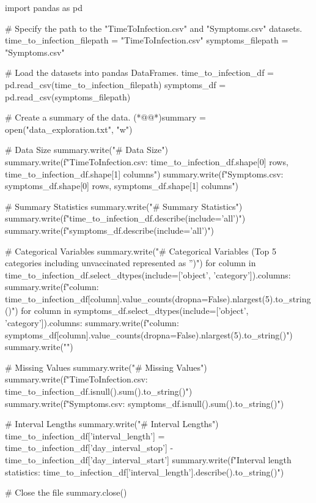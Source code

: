\documentclass[11pt]{article}
\begin{document}
\begin{python}

import pandas as pd

# Specify the path to the "TimeToInfection.csv" and "Symptoms.csv" datasets.
time_to_infection_filepath = "TimeToInfection.csv"
symptoms_filepath = "Symptoms.csv"

# Load the datasets into pandas DataFrames.
time_to_infection_df = pd.read_csv(time_to_infection_filepath)
symptoms_df = pd.read_csv(symptoms_filepath)

# Create a summary of the data.
(*@@*)summary = open("data_exploration.txt", "w")

# Data Size
summary.write("# Data Size\n")
summary.write(f"TimeToInfection.csv: {time_to_infection_df.shape[0]} rows, {time_to_infection_df.shape[1]} columns\n")
summary.write(f"Symptoms.csv: {symptoms_df.shape[0]} rows, {symptoms_df.shape[1]} columns\n\n")

# Summary Statistics
summary.write("# Summary Statistics\n")
summary.write(f"{time_to_infection_df.describe(include='all')}\n\n")
summary.write(f"{symptoms_df.describe(include='all')}\n\n")

# Categorical Variables
summary.write("# Categorical Variables (Top 5 categories including unvaccinated represented as '')\n")
for column in time_to_infection_df.select_dtypes(include=['object', 'category']).columns:
    summary.write(f"{column}: {time_to_infection_df[column].value_counts(dropna=False).nlargest(5).to_string()}\n")
for column in symptoms_df.select_dtypes(include=['object', 'category']).columns:
    summary.write(f"{column}: {symptoms_df[column].value_counts(dropna=False).nlargest(5).to_string()}\n")
summary.write("\n")

# Missing Values
summary.write("# Missing Values\n")
summary.write(f"TimeToInfection.csv: {time_to_infection_df.isnull().sum().to_string()}\n\n")
summary.write(f"Symptoms.csv: {symptoms_df.isnull().sum().to_string()}\n")

# Interval Lengths
summary.write("# Interval Lengths\n")
time_to_infection_df['interval_length'] = time_to_infection_df['day_interval_stop'] - time_to_infection_df['day_interval_start']
summary.write(f"Interval length statistics: {time_to_infection_df['interval_length'].describe().to_string()}\n")

# Close the file
summary.close()

\end{python}
\end{document}
